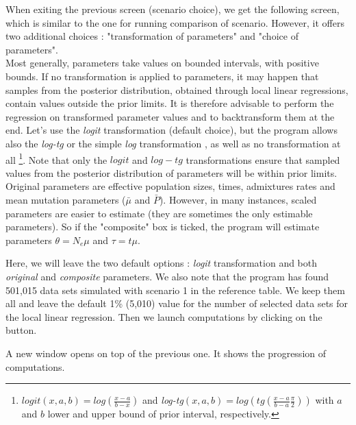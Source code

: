 \newpage
When exiting the previous screen (scenario choice), we get the following screen, which is similar to the one for running comparison of scenario. However, it offers two additional choices : "transformation of parameters" and "choice of parameters".\\
 Most generally, parameters take values on bounded intervals, with positive bounds. If no transformation is applied to parameters, it may happen that samples from the posterior distribution, obtained through local linear regressions, contain values outside the prior limits. It is therefore advisable to perform the regression on transformed parameter values and to backtransform them at the end. Let's use the \emph{logit} transformation (default choice), but the program allows also the \emph{log-tg} \citep{HS2005} or the simple \emph{log} transformation \citep{EB2004}, as well as no transformation at all
\footnote{$logit(x,a,b)=log(\frac{x-a}{b-x})$ and \emph{log-tg}$(x,a,b)=log(tg(\frac{x-a}{b-a}\frac{\pi}{2}))$ with $a$ and $b$ lower and upper bound of prior interval, respectively.}. Note that only the $logit$ and $log-tg$ transformations ensure that sampled values from the posterior distribution of parameters will be within prior limits.\\
Original parameters are effective population sizes, times, admixtures rates and mean mutation parameters ($\bar{\mu}$ and $\bar{P}$). However, in many instances, scaled parameters are easier to estimate (they are sometimes the only estimable parameters). So if the "composite" box is ticked, the program will estimate parameters $\theta  = N_e\mu$ and $\tau = t\mu$.

Here, we will leave the two default options : \emph{logit} transformation and both \emph{original} and \emph{composite} parameters. We also note that the program has found 501,015 data sets simulated with scenario 1 in the reference table. We keep them all and leave the default 1\% (5,010) value for the number of selected data sets for the local linear regression. Then we launch computations by clicking on the  button.

\newpage
A new window opens on top of the previous one. It shows the progression of computations.



